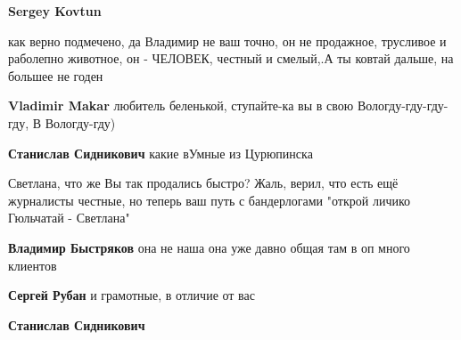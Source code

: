 \begin{itemize}
\begin{itemize}
\textbf{Sergey Kovtun} 

как верно подмечено, да Владимир не ваш точно, он не продажное, трусливое и
раболепно животное, он - ЧЕЛОВЕК, честный и смелый,.А ты ковтай дальше, на
большее не годен

 
\textbf{Vladimir Makar} любитель беленькой, ступайте-ка вы в свою Вологду-гду-гду-гду,
В Вологду-гду)

 
\textbf{Станислав Сидникович} какие вУмные из Цурюпинска 🤣🤣

 
Светлана, что же Вы так продались быстро? Жаль, верил, что есть ещё журналисты
честные, но теперь ваш путь с бандерлогами "открой личико Гюльчатай - Светлана"


 
\textbf{Владимир Быстряков} она не наша она уже давно общая там в оп много клиентов

 
\textbf{Сергей Рубан} и грамотные, в отличие от вас

 
\textbf{Станислав Сидникович} 


\end{itemize}
\end{itemize}
